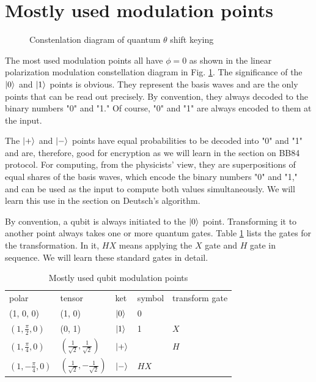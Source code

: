 \documentclass[oneside, letter, 12pt]{book}
\begin{document}
\section{Mostly used modulation points}\label{Sec-points-qubit}
\begin{figure}[h]\label{qQPSK}
\caption{Constenlation diagram of quantum $\theta$ shift keying}
\end{figure}

The most used modulation points all have $\phi=0$ as shown in the linear polarization modulation constellation diagram in Fig. \ref{qQPSK}. The significance of the $\vert {0} \rangle_{}$ and $\vert {1} \rangle_{}$ points is obvious. They represent the basis waves and are the only points that can be read out precisely. By convention, they always decoded to the binary numbers "0" and "1." Of course, "0" and "1" are always encoded to them at the input.

The $\vert {+} \rangle_{}$ and $\vert {-} \rangle_{}$ points have equal probabilities to be decoded into "0" and "1" and are, therefore, good for encryption as we will learn in the section on BB84 protocol. For computing, from the physicists' view, they are superpositions of equal shares of the basis waves, which encode the binary numbers "0" and "1," and can be used as the input to compute both values simultaneously. We will learn this use in the section on Deutsch's algorithm.

By convention, a qubit is always initiated to the $\vert {0} \rangle_{}$ point. Transforming it to another point always takes one or more quantum gates. Table \ref{t-qubitPoints} lists the gates for the transformation. In it, $HX$ means applying the $X$ gate and $H$ gate in sequence. We will learn these standard gates in detail.

\begin{table}[]
\label{t-qubitPoints}
\caption{Mostly used qubit modulation points}
\centering
\begin{tabular}{lllll}
polar & tensor & ket & symbol & transform gate   \\
(1, 0, 0) & (1, 0) & $\vert {0} \rangle_{}$ & 0 & \\
$(1, \frac \pi 2, 0)$ & (0, 1) & $\vert {1} \rangle_{}$ & 1 & $X$ \\
$(1, \frac \pi 4, 0)$ & $(\frac 1 {\sqrt{2}}, \frac 1 {\sqrt{2}})$ & $\vert {+} \rangle_{}$ & & $H$ \\
$(1, - \frac \pi 4, 0)$ & $(\frac 1 {\sqrt{2}}, - \frac 1 {\sqrt{2}})$ & $\vert {-} \rangle_{}$ & $HX$
\end{tabular}
\end{table}
\end{document}

